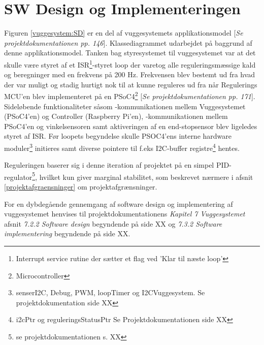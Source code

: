 \section{SW Design og Implementeringen}
\label{vs_sw}
Figuren \ref{vuggesystem:SD} er en del af vuggesystemets applikationsmodel [\textit{Se projektdokumentationen pp. 146}]. Klassediagrammet udarbejdet på baggrund af denne applikationsmodel.
Tanken bag styresystemet til vuggesystemet var at det skulle være styret af et ISR\footnote{Interrupt service rutine der sætter et flag ved 'Klar til næste loop'}-styret loop der varetog alle reguleringsmæssige kald og beregninger med en frekvens på 200 Hz. Frekvensen blev bestemt ud fra hvad der var muligt og stadig hurtigt nok til at kunne reguleres ud fra når Regulerings MCU'en blev implementeret på en PSoC4\footnote{Microcontroller} \citep{website:Cypress} [\textit{Se projektdokumentationen pp. 171}]. Sideløbende funktionaliteter såsom \iic-kommunikationen mellem Vuggesystemet (PSoC4'en) og Controller (Raspberry Pi'en), \iic-kommunikationen mellem PSoC4'en og vinkelsensoren samt aktiveringen af en end-stopsensor blev ligeledes styret af ISR. Før loopets begyndelse skulle PSOC4'ens interne hardware moduler\footnote{senserI2C, Debug, PWM, loopTimer og I2CVuggesystem. Se projektdokumentation side XX} initieres samt diverse pointere til f.eks I2C-buffer registre\footnote{i2cPtr og reguleringsStatusPtr Se Projektdokumentationen side XX} hentes.

Reguleringen baserer sig i denne iteration af projektet på en simpel PID-regulator\footnote{ se projektdokumentationen s. XX}, hvilket kun giver marginal stabilitet, som beskrevet nærmere i afsnit \vref{projektafgraensninger} om projektafgrænsninger.

For en dybdegående gennemgang af software design og implementering af vuggesystemet henvises til projektdokumentationens \textit{Kapitel 7 Vuggesystemet} afsnit \textit{7.2.2 Software design} begyndende på side XX og \textit{7.3.2 Software implementering} begyndende på side XX.

